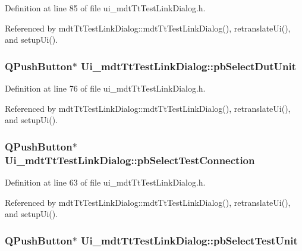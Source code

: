 Definition at line 85 of file ui\-\_\-mdt\-Tt\-Test\-Link\-Dialog.\-h.



Referenced by mdt\-Tt\-Test\-Link\-Dialog\-::mdt\-Tt\-Test\-Link\-Dialog(), retranslate\-Ui(), and setup\-Ui().

\hypertarget{class_ui__mdt_tt_test_link_dialog_afe9a255ad456ab5e114ba7de1aa70fc7}{
\subsubsection[{pb\-Select\-Dut\-Unit}]{\setlength{\rightskip}{0pt plus 5cm}Q\-Push\-Button$\ast$ Ui\-\_\-mdt\-Tt\-Test\-Link\-Dialog\-::pb\-Select\-Dut\-Unit}}\label{class_ui__mdt_tt_test_link_dialog_afe9a255ad456ab5e114ba7de1aa70fc7}


Definition at line 76 of file ui\-\_\-mdt\-Tt\-Test\-Link\-Dialog.\-h.



Referenced by mdt\-Tt\-Test\-Link\-Dialog\-::mdt\-Tt\-Test\-Link\-Dialog(), retranslate\-Ui(), and setup\-Ui().

\hypertarget{class_ui__mdt_tt_test_link_dialog_ac68599c57b51935e469cb0b1f8e16146}{
\subsubsection[{pb\-Select\-Test\-Connection}]{\setlength{\rightskip}{0pt plus 5cm}Q\-Push\-Button$\ast$ Ui\-\_\-mdt\-Tt\-Test\-Link\-Dialog\-::pb\-Select\-Test\-Connection}}\label{class_ui__mdt_tt_test_link_dialog_ac68599c57b51935e469cb0b1f8e16146}


Definition at line 63 of file ui\-\_\-mdt\-Tt\-Test\-Link\-Dialog.\-h.



Referenced by mdt\-Tt\-Test\-Link\-Dialog\-::mdt\-Tt\-Test\-Link\-Dialog(), retranslate\-Ui(), and setup\-Ui().

\hypertarget{class_ui__mdt_tt_test_link_dialog_a13fde7ce3d35533de08fb470043fdd55}{
\subsubsection[{pb\-Select\-Test\-Unit}]{\setlength{\rightskip}{0pt plus 5cm}Q\-Push\-Button$\ast$ Ui\-\_\-mdt\-Tt\-Test\-Link\-Dialog\-::pb\-Select\-Test\-Unit}}\label{class_ui__mdt_tt_test_link_dialog_a13fde7ce3d35533de08fb470043fdd55}



